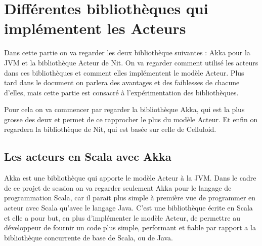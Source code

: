 \documentclass[11pt, a4paper]{article}
\begin{document}
\section{Différentes bibliothèques qui implémentent les Acteurs}
Dans cette partie on va regarder les deux bibliothèque suivantes : Akka pour la JVM et la bibliothèque Acteur de Nit. On va regarder comment utilisé les acteurs dans ces bibliothèques et comment elles implémentent le modèle Acteur. Plus tard dans le document on parlera des avantages et des faiblesses de chacune d'elles, mais cette partie est consacré à l'expérimentation des bibliothèques. 
\par Pour cela on va commencer par regarder la bibliothèque Akka, qui est la plus grosse des deux et permet de ce rapprocher le plus du modèle Acteur. Et enfin on regardera la bibliothèque de Nit, qui est basée sur celle de Celluloid.

\subsection{Les acteurs en Scala avec Akka}
Akka est une bibliothèque qui apporte le modèle Acteur à la JVM. Dans le cadre de ce projet de session on va regarder seulement Akka pour le langage de programmation Scala, car il parait plus simple à première vue de programmer en acteur avec Scala qu'avec le langage Java. C'est une bibliothèque écrite en Scala et elle a pour but, en plus d'implémenter le modèle Acteur, de permettre au développeur de fournir un code plus simple, performant et fiable par rapport a la bibliothèque concurrente de base de Scala, ou de Java.
\end{document}
